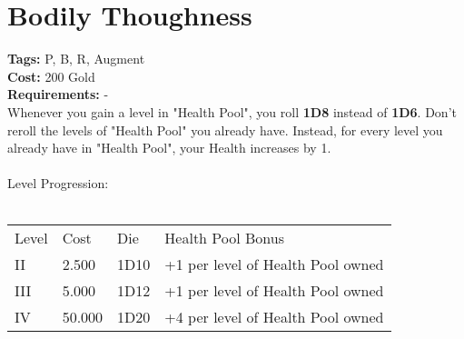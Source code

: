 \section{Bodily Thoughness}\label{sec:bodilythoughness}
\textbf{Tags:} P, B, R, Augment\\
\textbf{Cost:} 200 Gold\\
\textbf{Requirements:} -\\
Whenever you gain a level in "Health Pool", you roll \textbf{1D8} instead of \textbf{1D6}.
Don't reroll the levels of "Health Pool" you already have.
Instead, for every level you already have in "Health Pool", your Health increases by 1.\\
\\
Level Progression:\\
\\
\begin{tabular}{l | l | l | l}
    Level & Cost & Die & Health Pool Bonus\\
    II & 2.500 & 1D10 & +1 per level of Health Pool owned\\
    III & 5.000 & 1D12 & +1 per level of Health Pool owned\\
    IV & 50.000 & 1D20 & +4 per level of Health Pool owned\\
\end{tabular}